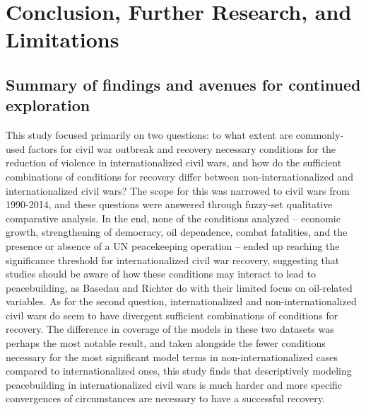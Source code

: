 \documentclass{article}
\begin{document}
\section{Conclusion, Further Research, and Limitations}
\subsection{Summary of findings and avenues for continued exploration}
This study focused primarily on two questions: to what extent are commonly-used factors for civil war outbreak and recovery necessary conditions for the reduction of violence in internationalized civil wars, and how do the sufficient combinations of conditions for recovery differ between non-internationalized and internationalized civil wars? The scope for this was narrowed to civil wars from 1990-2014, and these questions were answered through fuzzy-set qualitative comparative analysis. In the end, none of the conditions analyzed -- economic growth, strengthening of democracy, oil dependence, combat fatalities, and the presence or absence of a UN peacekeeping operation -- ended up reaching the significance threshold for internationalized civil war recovery, suggesting that studies should be aware of how these conditions may interact to lead to peacebuilding, as Basedau and Richter do with their limited focus on oil-related variables. As for the second question, internationalized and non-internationalized civil wars do seem to have divergent sufficient combinations of conditions for recovery. The difference in coverage of the models in these two datasets was perhaps the most notable result, and taken alongside the fewer conditions necessary for the most significant model terms in non-internationalized cases compared to internationalized ones, this study finds that descriptively modeling peacebuilding in internationalized civil wars is much harder and more specific convergences of circumstances are necessary to have a successful recovery.
\end{document}
